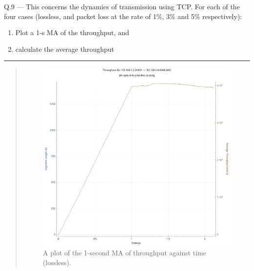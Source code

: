 \documentclass{article}
\newcommand\Que[2]{%
   \begin{samepage}
   \leavevmode\par
   \noindent
   Q.#1 --- #2\par\vspace{10pt}\hrule\vspace{10pt}
   \end{samepage}}
\newenvironment{ans}
   {\fbox{Answer}\begin{quote}\nopagebreak}
   {\end{quote}}
\begin{document}
\Que{9}{
This concerns the dynamics of transmission using TCP. For each
of the four cases (lossless, and packet loss at the rate of 1\%,
3\% and 5\% respectively):
\begin{enumerate}
\item Plot a 1-s MA of the throughput, and
\item calculate the average throughput
\end{enumerate}}
\begin{ans}

\begin{figure}[H]
\centering
\includegraphics[width=16cm]{data/q9-1msav-throughput.pdf}
\caption{A plot of the 1-second MA of throughput against time
(lossless).}
\label{fig:tcp-lossless}
\end{figure}


\end{ans}
\end{document}

